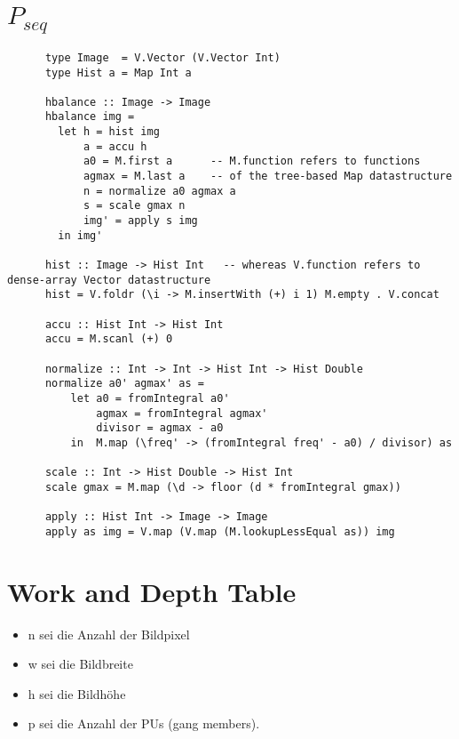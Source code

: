 \documentclass{article}
\newcommand{\seq}[0]{$P_{seq}$}
\begin{document}
    \section{ \seq}
      \begin{lstlisting}
      type Image  = V.Vector (V.Vector Int)
      type Hist a = Map Int a

      hbalance :: Image -> Image
      hbalance img =
        let h = hist img
            a = accu h
            a0 = M.first a      -- M.function refers to functions
            agmax = M.last a    -- of the tree-based Map datastructure
            n = normalize a0 agmax a
            s = scale gmax n
            img' = apply s img
        in img'

      hist :: Image -> Hist Int   -- whereas V.function refers to dense-array Vector datastructure
      hist = V.foldr (\i -> M.insertWith (+) i 1) M.empty . V.concat

      accu :: Hist Int -> Hist Int
      accu = M.scanl (+) 0

      normalize :: Int -> Int -> Hist Int -> Hist Double
      normalize a0' agmax' as =
          let a0 = fromIntegral a0'
              agmax = fromIntegral agmax'
              divisor = agmax - a0
          in  M.map (\freq' -> (fromIntegral freq' - a0) / divisor) as

      scale :: Int -> Hist Double -> Hist Int
      scale gmax = M.map (\d -> floor (d * fromIntegral gmax))

      apply :: Hist Int -> Image -> Image
      apply as img = V.map (V.map (M.lookupLessEqual as)) img
      \end{lstlisting}
    
    \newpage
    
    \section{Work and Depth Table}
      
      \begin{itemize}
        \item n sei die Anzahl der Bildpixel
        \item w sei die Bildbreite
        \item h sei die Bildhöhe
        \item p sei die Anzahl der PUs (gang members).
      \end{itemize}
      
\end{document}
